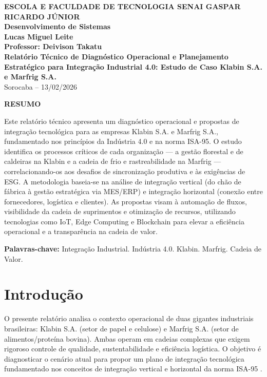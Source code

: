 \documentclass[12pt,a4paper,oneside]{article}
\begin{document}
\begin{center}
  \textbf{\large ESCOLA E FACULDADE DE TECNOLOGIA SENAI GASPAR RICARDO JÚNIOR}\\
  \textbf{Desenvolvimento de Sistemas}\\[1cm]
  \textbf{\Large Lucas Miguel Leite}\\[0.5cm]
  \textbf{Professor: Deivison Takatu}\\[2cm]
  \textbf{\LARGE\textbf{Relatório Técnico de Diagnóstico Operacional e Planejamento Estratégico para Integração Industrial 4.0: Estudo de Caso Klabin S.A. e Marfrig S.A.}}\\[1cm]
  Sorocaba -- 13/02/2026
\end{center}

\vspace{1cm}

\begin{center}
  \textbf{RESUMO}
\end{center}

Este relatório técnico apresenta um diagnóstico operacional e propostas de integração tecnológica para as empresas Klabin S.A. e Marfrig S.A., fundamentado nos princípios da Indústria 4.0 e na norma ISA-95. O estudo identifica os processos críticos de cada organização --- a gestão florestal e de caldeiras na Klabin e a cadeia de frio e rastreabilidade na Marfrig --- correlacionando-os aos desafios de sincronização produtiva e às exigências de ESG. A metodologia baseia-se na análise de integração vertical (do chão de fábrica à gestão estratégica via MES/ERP) e integração horizontal (conexão entre fornecedores, logística e clientes). As propostas visam à automação de fluxos, visibilidade da cadeia de suprimentos e otimização de recursos, utilizando tecnologias como IoT, Edge Computing e Blockchain para elevar a eficiência operacional e a transparência na cadeia de valor.

\vspace{0.5cm}
\textbf{Palavras-chave:} Integração Industrial. Indústria 4.0. Klabin. Marfrig. Cadeia de Valor.

\newpage

\section{Introdução}

O presente relatório analisa o contexto operacional de duas gigantes industriais brasileiras: Klabin S.A. (setor de papel e celulose) e Marfrig S.A. (setor de alimentos/proteína bovina). Ambas operam em cadeias complexas que exigem rigoroso controle de qualidade, sustentabilidade e eficiência logística. O objetivo é diagnosticar o cenário atual para propor um plano de integração tecnológica fundamentado nos conceitos de integração vertical e horizontal da norma ISA-95 \cite{isa95}.
\end{document}
